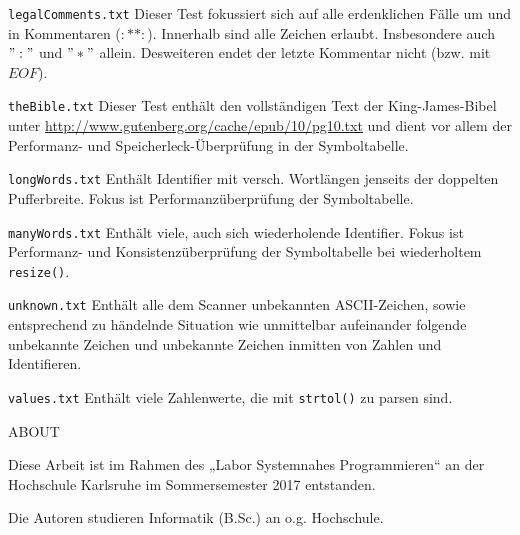 \documentclass[
a4paper,   %
11pt,      %
oneside,   %
onecolumn, %
final      %
]{article}
\newcommand{\code}[1]{\lstinline$#1$}
\begin{document}
\begin{description}
\item{\texttt{legalComments.txt}} Dieser Test fokussiert sich auf alle erdenklichen Fälle um und in Kommentaren ($:* *:$). Innerhalb sind alle Zeichen erlaubt. Insbesondere auch $":"$ und $"*"$ allein. Desweiteren endet der letzte Kommentar nicht (bzw. mit $EOF$).

\item{\texttt{theBible.txt}} Dieser Test enthält den vollständigen Text der King-James-Bibel unter \url{http://www.gutenberg.org/cache/epub/10/pg10.txt} und dient vor allem der Performanz- und Speicherleck-Überprüfung in der Symboltabelle.

\item{\texttt{longWords.txt}} Enthält Identifier mit versch. Wortlängen jenseits der doppelten Pufferbreite. Fokus ist Performanzüberprüfung der Symboltabelle.

\item{\texttt{manyWords.txt}} Enthält viele, auch sich wiederholende Identifier. Fokus ist Performanz- und Konsistenzüberprüfung der Symboltabelle bei wiederholtem \code{resize()}.

\item{\texttt{unknown.txt}} Enthält alle dem Scanner unbekannten ASCII-Zeichen, sowie entsprechend zu händelnde Situation wie unmittelbar aufeinander folgende unbekannte Zeichen und unbekannte Zeichen inmitten von Zahlen und Identifieren.

\item{\texttt{values.txt}} Enthält viele Zahlenwerte, die mit \code{strtol()} zu parsen sind.

\end{description}






\appendix


\begin{description}
\vspace{2cm}
\item{ABOUT}
    \begin{description}
    \item{Diese Arbeit} ist im Rahmen des „Labor Systemnahes Programmieren“ an der Hochschule Karlsruhe im Sommersemester 2017 entstanden.

    \item{Die Autoren} studieren Informatik (B.Sc.) an o.g. Hochschule.
\end{description}
\end{description}


%
%
\end{document}
